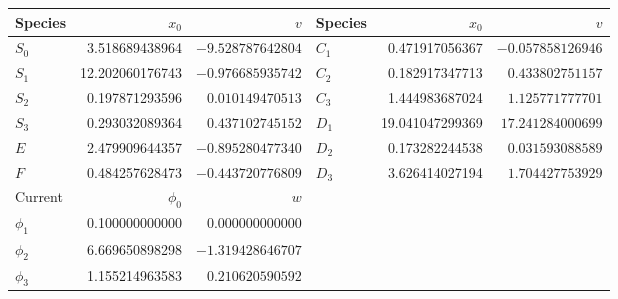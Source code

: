 \begin{tabular}{lrr@{\qquad}lrr}
\toprule
Species & $x_0$ & $v$ & Species & $x_0$ & $v$\\
\midrule
$S_0$ & 3.518689438964 & $-9.528787642804$ & $C_1$ & 0.471917056367 & $-0.057858126946$\\
$S_1$ & 12.202060176743 & $-0.976685935742$ & $C_2$ & 0.182917347713 & $0.433802751157$\\
$S_2$ & 0.197871293596 & $0.010149470513$ & $C_3$ & 1.444983687024 & $1.125771777701$\\
$S_3$ & 0.293032089364 & $0.437102745152$ & $D_1$ & 19.041047299369 & $17.241284000699$\\
$E$ & 2.479909644357 & $-0.895280477340$ & $D_2$ & 0.173282244538 & $0.031593088589$\\
$F$ & 0.484257628473 & $-0.443720776809$ & $D_3$ & 3.626414027194 & $1.704427753929$\\
\midrule
Current & $\phi_0$ & $w$ &&&\\
\midrule
$\phi_1$ & 0.100000000000 & $0.000000000000$ &&&\\
$\phi_2$ & 6.669650898298 & $-1.319428646707$ &&&\\
$\phi_3$ & 1.155214963583 & $0.210620590592$ &&&\\
\bottomrule
\end{tabular}
